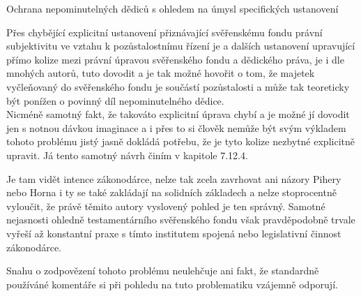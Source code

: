 \documentclass{article}
\begin{document}
    \begin{enumerate}
 {\Large\item[2.] Ochrana nepominutelných dědiců s ohledem na úmysl specifických ustanovení}
 \end{enumerate}
 
 Přes chybějící explicitní ustanovení přiznávající svěřenskému fondu právní subjektivitu ve vztahu k pozůstalostnímu řízení je a dalších ustanovení upravující přímo kolize mezi právní úpravou svěřenského fondu a dědického práva, je i dle mnohých autorů, tuto dovodit a je tak možné hovořit o tom, že majetek vyčleňovaný do svěřenského fondu je součástí pozůstalosti a může tak teoreticky být ponížen o povinný díl nepominutelného dědice.\\
 
 Nicméně samotný fakt, že takováto explicitní úprava chybí a je možné jí dovodit jen s notnou dávkou imaginace a i přes to si člověk nemůže být svým výkladem tohoto problému jistý jasně dokládá potřebu, že je tyto kolize nezbytné explicitně upravit. Já tento samotný návrh činím v kapitole 7.12.4.
 
 Je tam vidět intence zákonodárce, nelze tak zcela zavrhovat ani názory Pihery nebo Horna i ty se také zakládají na solidních základech a nelze stoprocentně vyloučit, že právě těmito autory vyslovený pohled je ten správný. Samotné nejasnosti ohledně testamentárního svěřenského fondu však pravděpodobně trvale vyřeší až konstantní praxe s tímto institutem spojená nebo legislativní činnost zákonodárce.
 




Snahu o zodpovězení tohoto problému neulehčuje ani fakt, že standardně používáné komentáře si při pohledu na tuto problematiku vzájemně odporují.
\end{document}
